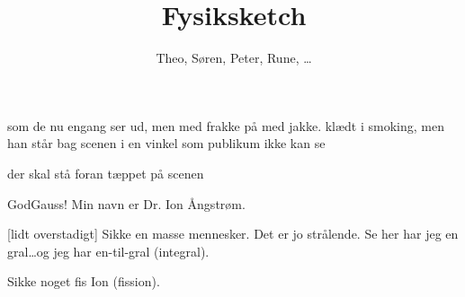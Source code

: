 \documentclass[11pt]{article}
\title{Fysiksketch}
\author{Theo, Søren, Peter, Rune, \ldots}
\begin{document}
\maketitle

\begin{sketch}

\begin{roles}
   som de nu engang ser ud, men med frakke på
   med jakke. 
   klædt i smoking, men han står bag scenen
       i en vinkel som publikum ikke kan se
\end{roles}

\begin{props}
   der skal stå foran tæppet på scenen
\end{props}
\newcommand{\skrot}[1]{}
\skrot{
\scene{Tæppet er trukket for. Det er sidst på aftenen. Pausen er slut. 
Publikum har indfundet sig på sine pladser, og stilheden sænker sig som en 
dyne over det store auditorium. Folk er spændte. Bagest i salen hører man 
lyden af auditoriets trædøre, der forsigtigt lukkes af to revyttere. 
Steen ser nervøst på sit ur. Henning konfererer med lysmændene om hvem der 
skal give signal. De bliver enige. Loftlyset slukkes. Mørket indtræffer ---
i mere end \'en forstand, og man hører speakerens klare stemme helt oppe 
på de bagerste rækker. Anden akt er nu i gang.}

\says{speaker} [med klar stemme] Vigtig meddelelse! Ny, SENERE dato for
2.akt: lørdag d. 30. august. Revygruppen har desværre ikke kunnet overkomme at
sende breve ud til alle der har købt billet. For ikke at skuffe evt.
fremmødte i dag, har vi derfor valgt at opføre en {\sc Beta}-udgave af
et kommende fysikrevynummer.
}


 God{\sc Gauss}! Min navn er Dr. {\sc Ion} {\sc Ångstrøm}.

 [lidt overstadigt] Sikke en {\sc masse} mennesker. 
Det er jo {\sc strålende}. Se her har jeg en gral\ldots og jeg har 
en-til-gral ({\sc integral}). 


 Sikke noget fis {\sc Ion} ({\sc fission}). 


\end{sketch}
\end{document}
